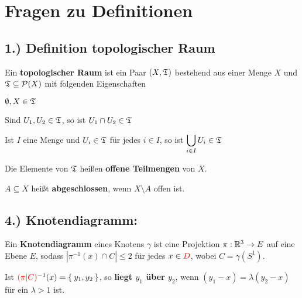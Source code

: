 \documentclass[a5paper,oneside]{scrbook}
\begin{document}
\chapter{Fragen zu Definitionen}
\section*{1.) Definition topologischer Raum}
\begin{definition}%
    Ein \textbf{topologischer Raum} ist ein Paar $(X, \mathfrak{T})$ bestehend
    aus einer Menge $X$ und $\mathfrak{T} \subseteq \mathcal{P}(X)$ mit
    folgenden Eigenschaften
    \begin{defenumprops}
        \item $\emptyset, X \in \mathfrak{T}$
        \item \label{def:topologie.ii} Sind $U_1, U_2 \in \mathfrak{T}$, so ist $U_1 \cap U_2 \in \mathfrak{T}$
        \item Ist $I$ eine Menge und $U_i \in \mathfrak{T}$ für jedes $i \in I$,
              so ist $\displaystyle \bigcup_{i \in I} U_i \in \mathfrak{T}$
    \end{defenumprops}
    Die Elemente von $\mathfrak{T}$ heißen \textbf{offene Teilmengen} von $X$. 

    $A \subseteq X$ heißt \textbf{abgeschlossen}, wenn $X \setminus A$ offen ist.
\end{definition}


\section*{4.) Knotendiagramm:}
\begin{definition}%
    Ein \textbf{Knotendiagramm} eines Knotens $\gamma$ ist eine 
    Projektion $\pi: \mathbb{R}^3 \rightarrow E$ auf eine Ebene $E$, sodass
    $|\pi^{-1}(x) \cap C| \leq 2$ für jedes $x \in {\color{red}D}$, wobei $C = \gamma(S^1)$.

    Ist ${\color{red}(\pi|C)}^{-1}(x) = \Set{y_1, y_2}$, so \textbf{liegt $y_1$ über $y_2$},
    wenn $(y_1-x) = \lambda (y_2 - x)$ für ein $\lambda > 1$ ist.
\end{definition}
\end{document}
